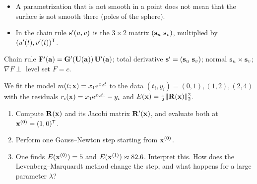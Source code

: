 \begin{solution}
\begin{trap}
\begin{itemize}
\item A parametrization that is not smooth in a point does not mean that the surface is not smooth there (poles of the sphere).
\item In the chain rule $\mathbf{s}'(u,v)$ is the $3\times2$ matrix $(\mathbf{s}_u\ \mathbf{s}_v)$, multiplied by $(u'(t),v'(t))^{\mathsf{T}}$.
\end{itemize}
\end{trap}
\begin{heart}
Chain rule $\mathbf{F}'(\mathbf{a})=\mathbf{G}'(\mathbf{U}(\mathbf{a}))\,\mathbf{U}'(\mathbf{a})$; total derivative $\mathbf{s}'=(\mathbf{s}_u\ \mathbf{s}_v)$; normal $\mathbf{s}_u\times\mathbf{s}_v$; $\nabla F\perp$ level set $F=c$.
\end{heart}
\end{solution}

We fit the model $m(t;\mathbf{x})=x_1\mathrm{e}^{x_2t}$ to the data $(t_i,y_i)=(0,1),(1,2),(2,4)$ with the residuals $r_i(\mathbf{x})=x_1\mathrm{e}^{x_2t_i}-y_i$ and $E(\mathbf{x})=\frac12\lVert \mathbf{R}(\mathbf{x})\rVert_2^2$.
\begin{enumerate}
\item Compute $\mathbf{R}(\mathbf{x})$ and its Jacobi matrix $\mathbf{R}'(\mathbf{x})$, and evaluate both at $\mathbf{x}^{(0)}=(1,0)^{\mathsf{T}}$.
\item Perform one Gauss--Newton step starting from $\mathbf{x}^{(0)}$.
\item One finds $E(\mathbf{x}^{(0)})=5$ and $E(\mathbf{x}^{(1)})\approx82.6$. Interpret this. How does the Levenberg--Marquardt method change the step, and what happens for a large parameter $\lambda$?
\end{enumerate}


